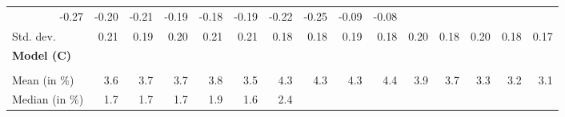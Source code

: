 \begin{tabular}{lllllllllllllll}
  \multicolumn{1}{r}{-0.27} &
  \multicolumn{1}{r}{-0.20} &
  \multicolumn{1}{r}{-0.21} &
  \multicolumn{1}{r}{-0.19} &
  \multicolumn{1}{r}{-0.18} &
  \multicolumn{1}{r}{-0.19} &
  \multicolumn{1}{r}{-0.22} &
  \multicolumn{1}{r}{-0.25} &
  \multicolumn{1}{r}{-0.09} &
  \multicolumn{1}{r}{-0.08} \\
\multicolumn{1}{l}{\hspace{2em}Std. dev.} &
  \multicolumn{1}{|r}{0.21} &
  \multicolumn{1}{r}{0.19} &
  \multicolumn{1}{r}{0.20} &
  \multicolumn{1}{r}{0.21} &
  \multicolumn{1}{r}{0.21} &
  \multicolumn{1}{r}{0.18} &
  \multicolumn{1}{r}{0.18} &
  \multicolumn{1}{r}{0.19} &
  \multicolumn{1}{r}{0.18} &
  \multicolumn{1}{r}{0.20} &
  \multicolumn{1}{r}{0.18} &
  \multicolumn{1}{r}{0.20} &
  \multicolumn{1}{r}{0.18} &
  \multicolumn{1}{r}{0.17} \\
\multicolumn{1}{l}{{\textbf{Model (C)}}} &
  \multicolumn{1}{|r}{} &
  \multicolumn{1}{r}{} &
  \multicolumn{1}{r}{} &
  \multicolumn{1}{r}{} &
  \multicolumn{1}{r}{} &
  \multicolumn{1}{r}{} &
  \multicolumn{1}{r}{} &
  \multicolumn{1}{r}{} &
  \multicolumn{1}{r}{} &
  \multicolumn{1}{r}{} &
  \multicolumn{1}{r}{} &
  \multicolumn{1}{r}{} &
  \multicolumn{1}{r}{} &
  \multicolumn{1}{r}{} \\
\multicolumn{1}{l}{\hspace{1em}{\textit{Additive term} ($\widehat{t}^{add}/\widetilde{p}$)}} &
  \multicolumn{1}{|r}{} &
  \multicolumn{1}{r}{} &
  \multicolumn{1}{r}{} &
  \multicolumn{1}{r}{} &
  \multicolumn{1}{r}{} &
  \multicolumn{1}{r}{} &
  \multicolumn{1}{r}{} &
  \multicolumn{1}{r}{} &
  \multicolumn{1}{r}{} &
  \multicolumn{1}{r}{} &
  \multicolumn{1}{r}{} &
  \multicolumn{1}{r}{} &
  \multicolumn{1}{r}{} &
  \multicolumn{1}{r}{} \\
\multicolumn{1}{l}{\hspace{2em}Mean (in $\%$)} &
  \multicolumn{1}{|r}{3.6} &
  \multicolumn{1}{r}{3.7} &
  \multicolumn{1}{r}{3.7} &
  \multicolumn{1}{r}{3.8} &
  \multicolumn{1}{r}{3.5} &
  \multicolumn{1}{r}{4.3} &
  \multicolumn{1}{r}{4.3} &
  \multicolumn{1}{r}{4.3} &
  \multicolumn{1}{r}{4.4} &
  \multicolumn{1}{r}{3.9} &
  \multicolumn{1}{r}{3.7} &
  \multicolumn{1}{r}{3.3} &
  \multicolumn{1}{r}{3.2} &
  \multicolumn{1}{r}{3.1} \\
\multicolumn{1}{l}{\hspace{2em}Median (in $\%$)} &
  \multicolumn{1}{|r}{1.7} &
  \multicolumn{1}{r}{1.7} &
  \multicolumn{1}{r}{1.7} &
  \multicolumn{1}{r}{1.9} &
  \multicolumn{1}{r}{1.6} &
  \multicolumn{1}{r}{2.4} &

\end{tabular}
